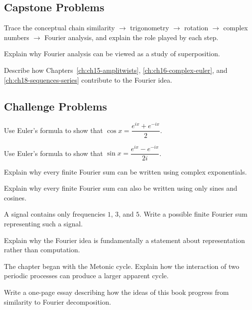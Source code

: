 \subsection*{Capstone Problems}
\begin{exercise}
Trace the conceptual chain similarity $\to$ trigonometry $\to$ rotation
$\to$ complex numbers $\to$ Fourier analysis, and explain the role
played by each step.
\end{exercise}
\begin{exercise}
Explain why Fourier analysis can be viewed as a study of superposition.
\end{exercise}
\begin{exercise}
Describe how Chapters~\ref{ch:ch15-amplitwists},
\ref{ch:ch16-complex-euler}, and \ref{ch:ch18-sequences-series}
contribute to the Fourier idea.
\end{exercise}

\subsection*{Challenge Problems}
\begin{exercise}
Use Euler's formula to show that $\cos x = \dfrac{e^{ix}+e^{-ix}}{2}$.
\end{exercise}
\begin{exercise}
Use Euler's formula to show that $\sin x = \dfrac{e^{ix}-e^{-ix}}{2i}$.
\end{exercise}
\begin{exercise}
Explain why every finite Fourier sum can be written using complex
exponentials.
\end{exercise}
\begin{exercise}
Explain why every finite Fourier sum can also be written using only
sines and cosines.
\end{exercise}
\begin{exercise}
A signal contains only frequencies $1$, $3$, and $5$. Write a possible
finite Fourier sum representing such a signal.
\end{exercise}
\begin{exercise}
Explain why the Fourier idea is fundamentally a statement about
representation rather than computation.
\end{exercise}
\begin{exercise}
The chapter began with the Metonic cycle. Explain how the interaction of
two periodic processes can produce a larger apparent cycle.
\end{exercise}
\begin{exercise}
Write a one-page essay describing how the ideas of this book progress
from similarity to Fourier decomposition.
\end{exercise}
